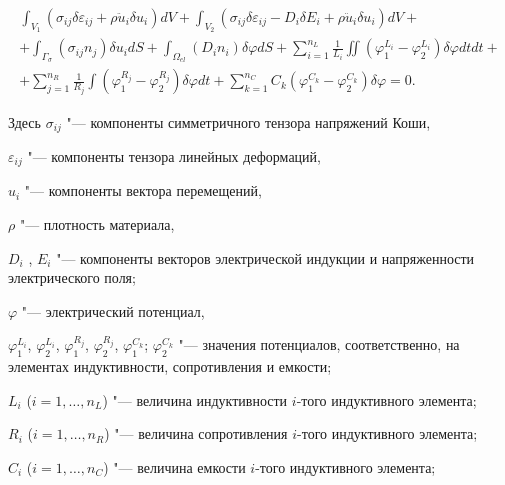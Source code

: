 \begin{multline}


\int_{V_1}{\left(\sigma_{ij}\delta\varepsilon_{ij}+\rho\ddot{u}_i\delta u_i\right)}dV

+\int_{V_2}{\left(\sigma_{ij}\delta\varepsilon_{ij}-D_i\delta E_i+\rho\ddot{u}_i\delta u_i\right)}dV+

\\

+\int_{\Gamma_\sigma}{(\sigma_{ij}n_j)\delta u_i}dS

+\int_{\Omega_{el}}{(D_in_i)\delta\varphi dS}

+\sum\limits_{i=1}^{n_L}\frac{1}{L_i}\iint{\left(\varphi_{1}^{L_i}-\varphi_{2}^{L_i}\right)\delta\varphi dtdt}+

\\

+\sum\limits_{j=1}^{n_R}{\frac{1}{R_j}\int{\left(\varphi_{1}^{R_j}-\varphi_{2}^{R_j}\right)\delta\varphi} dt}

+\sum\limits_{k=1}^{n_C}{C_k\left(\varphi_{1}^{C_k}-\varphi_{2}^{C_k}\right)}\delta\varphi=0.

\label{mult:eq1}

\end{multline}

Здесь  $\sigma_{ij}$ "--- компоненты симметричного тензора напряжений Коши,

$\varepsilon_{ij}$ "--- компоненты тензора линейных деформаций,

$u_{i}$  "--- компоненты вектора перемещений,

$\rho$ "--- плотность материала,

$D_{i}$ , $E_{i}$  "--- компоненты векторов электрической индукции и напряженности электрического поля;

$\varphi$ "--- электрический потенциал,

$\varphi_{1}^{L_i}$, $\varphi_{2}^{L_i}$, $\varphi_{1}^{R_j}$, $\varphi_{2}^{R_j}$, $\varphi_{1}^{C_k}$; $\varphi_{2}^{C_k}$ "--- значения потенциалов, соответственно, на элементах индуктивности, сопротивления и емкости;

$L_{i}$ ($i={1, \ldots, n_{L}}$) "--- величина индуктивности $i$-того индуктивного элемента;

$R_{i}$ ($i={1, \ldots, n_{R}}$) "--- величина сопротивления $i$-того индуктивного элемента;

$C_{i}$ ($i={1, \ldots, n_{C}}$) "--- величина емкости $i$-того индуктивного элемента;

